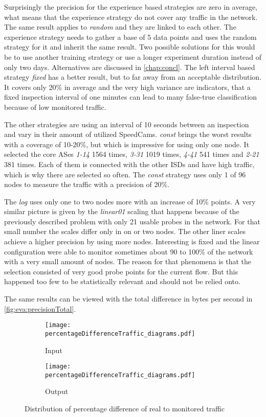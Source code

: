 \documentclass[thesis.tex]{subfiles}
\begin{document}
Surprisingly the precision for the experience based strategies are zero in average, what means that the experience strategy do not cover any traffic in the network. The same result applies to \textit{random} and they are linked to each other. The experience strategy needs to gather a base of 5 data points and uses the random strategy for it and inherit the same result. Two possible solutions for this would be to use another training strategy or use a longer experiment duration instead of only two days. Alternatives are discussed in \autoref{chap:concl}. The left interval based strategy \textit{fixed} has a better result, but to far away from an acceptable distribution. It covers only 20\% in average and the very high variance are indicators, that a fixed inspection interval of one minutes can lead to many false-true classification because of low monitored traffic.

The other strategies are using an interval of 10 seconds between an inspection and vary in their amount of utilized SpeedCams. \textit{const} brings the worst results with a coverage of 10-20\%, but which is impressive for using only one node. It selected the core ASes \textit{1-14} 1564 times, \textit{3-31} 1019 times, \textit{4-41} 541 times and \textit{2-21} 381 times. Each of them is connected with the other ISDs and have high traffic, which is why there are selected so often. The \textit{const} strategy uses only 1 of 96 nodes to measure the traffic with a precision of 20\%.

The \textit{log} uses only one to two nodes more with an increase of 10\% points. A very similar picture is given by the \textit{linear01} scaling that happens because of the previously described problem with only 21 usable probes in the network. For that small number the scales differ only in on or two nodes. The other liner scales achieve a higher precision by using more nodes. Interesting is fixed and the linear configuration were able to monitor sometimes about 90 to 100\% of the network with a very small amount of nodes. The reason for that phenomena is that the selection consisted of very good probe points for the current flow. But this happened too few to be statistically relevant and should not be relied onto.

The same results can be viewed with the total difference in bytes per second in \autoref{fig:eva:precisionTotal}.

\begin{figure}[h]
	\centering
	\begin{subfigure}{.48\linewidth}
		\centering
		\texttt{[image: percentageDifferenceTraffic\_diagrams.pdf]}
		\caption{Input}
		\label{fig:eva:precisionPercent:input}
	\end{subfigure}
	\hfil
	\begin{subfigure}{0.48\linewidth}
		\centering
		\texttt{[image: percentageDifferenceTraffic\_diagrams.pdf]}
		\caption{Output}
		\label{fig:eva:precisionPercent:output}
	\end{subfigure}
	\caption{Distribution of percentage difference of real to monitored traffic}
	\label{fig:eva:precisionPercent}
\end{figure}
\end{document}
